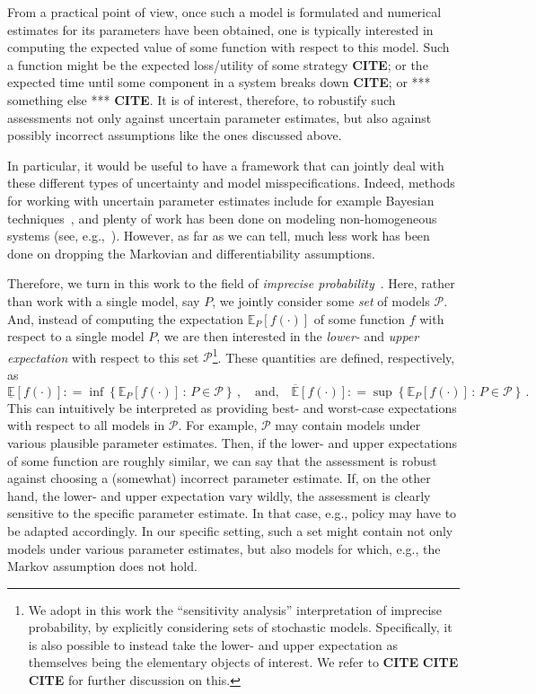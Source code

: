 \documentclass[10pt,a4paper]{paper}
\theoremstyle{definition}
\newcommand{\coloneqq}{:\!=}
\begin{document}
From a practical point of view, once such a model is formulated and numerical estimates for its parameters have been obtained, one is typically interested in computing the expected value of some function with respect to this model. Such a function might be the expected loss/utility of some strategy {\bf CITE}; or the expected time until some component in a system breaks down {\bf CITE}; or *** something else *** {\bf CITE}. It is of interest, therefore, to robustify such assessments not only against uncertain parameter estimates, but also against possibly incorrect assumptions like the ones discussed above. 

In particular, it would be useful to have a framework that can jointly deal with these different types of uncertainty and model misspecifications. Indeed, methods for working with uncertain parameter estimates include for example Bayesian techniques~\cite{insua2012bayesian}, and plenty of work has been done on modeling non-homogeneous systems (see, e.g.,~\cite{rindos1995exact,aalen1978empirical,johnson1989nonhomogeneous}). However, as far as we can tell, much less work has been done on dropping the Markovian and differentiability assumptions.

Therefore, we turn in this work to the field of \emph{imprecise probability}~\cite{Walley:1991vk}. Here, rather than work with a single model, say $P$, we jointly consider some \emph{set} of models $\mathcal{P}$. And, instead of computing the expectation $\mathbb{E}_P[f(\cdot)]$ of some function $f$ with respect to a single model $P$, we are then interested in the \emph{lower-} and \emph{upper expectation} with respect to this set $\mathcal{P}$\footnote{We adopt in this work the ``sensitivity analysis'' interpretation of imprecise probability, by explicitly considering sets of stochastic models. Specifically, it is also possible to instead take the lower- and upper expectation as themselves being the elementary objects of interest. We refer to {\bf CITE} {\bf CITE} {\bf CITE} for further discussion on this.}. These quantities are defined, respectively, as
\begin{equation*}
\underline{\mathbb{E}}[f(\cdot)] \coloneqq \inf\left\{\mathbb{E}_P[f(\cdot)]\,:\,P\in\mathcal{P}\right\}\,,\quad\text{and,}\quad\overline{\mathbb{E}}[f(\cdot)] \coloneqq \sup\left\{\mathbb{E}_P[f(\cdot)]\,:\,P\in\mathcal{P}\right\}\,.
\end{equation*}
This can intuitively be interpreted as providing best- and worst-case expectations with respect to all models in $\mathcal{P}$. For example, $\mathcal{P}$ may contain models under various plausible parameter estimates. Then, if the lower- and upper expectations of some function are roughly similar, we can say that the assessment is robust against choosing a (somewhat) incorrect parameter estimate. If, on the other hand, the lower- and upper expectation vary wildly, the assessment is clearly sensitive to the specific parameter estimate. In that case, e.g., policy may have to be adapted accordingly. In our specific setting, such a set might contain not only models under various parameter estimates, but also models for which, e.g., the Markov assumption does not hold. 
\end{document}

